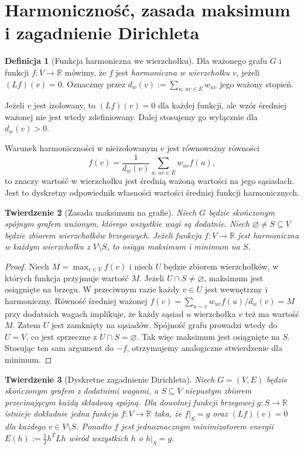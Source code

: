 \documentclass[11pt,a4paper]{report}
\numberwithin{equation}{section}
\theoremstyle{plain}
\newtheorem{twierdzenie}{Twierdzenie}[section]
\theoremstyle{definition}
\newtheorem{definicja}[twierdzenie]{Definicja}
\theoremstyle{remark}
\begin{document}
\section{Harmoniczność, zasada maksimum i zagadnienie Dirichleta}
\label{sec:tg-harmonic}

\begin{definicja}[Funkcja harmoniczna we wierzchołku]
Dla ważonego grafu $G$ i funkcji $f:V\to\mathbb R$
mówimy, że $f$ jest \emph{harmoniczna w wierzchołku $v$},
jeżeli $(Lf)(v)=0$. Oznaczmy przez $d_w(v):=\sum_{u:\,uv\in E}w_{uv}$
jego ważony stopień.
\end{definicja}

Jeżeli $v$ jest izolowany, to $(Lf)(v)=0$ dla każdej funkcji,
ale wzór średniej ważonej nie jest wtedy zdefiniowany.
Dalej stosujemy go wyłącznie dla $d_w(v)>0$.

Warunek harmoniczności w nieizolowanym $v$ jest równoważny równości
\[
f(v)=\frac{1}{d_w(v)}\sum_{u:\,uv\in E}w_{uv}f(u),
\]
to znaczy wartość w wierzchołku jest średnią ważoną wartości
na jego sąsiadach. Jest to dyskretny odpowiednik
własności wartości średniej funkcji harmonicznych.

\begin{twierdzenie}[Zasada maksimum na grafie]
Niech $G$ będzie skończonym spójnym grafem ważonym, którego
wszystkie wagi są dodatnie. Niech $\varnothing\ne S\subseteq V$
będzie zbiorem wierzchołków brzegowych. Jeżeli funkcja
$f:V\to\mathbb R$ jest harmoniczna w każdym wierzchołku
z $V\setminus S$, to osiąga maksimum i minimum na $S$.
\end{twierdzenie}

\begin{proof}
Niech $M=\max_{v\in V}f(v)$ i niech $U$ będzie zbiorem
wierzchołków, w których funkcja przyjmuje wartość $M$.
Jeżeli $U\cap S\ne\varnothing$, maksimum jest osiągnięte
na brzegu. W przeciwnym razie każdy $v\in U$ jest
wewnętrzny i harmoniczny. Równość średniej ważonej
$f(v)=\sum_{u\sim v}w_{uv}f(u)/d_w(v)=M$ przy dodatnich wagach
implikuje, że każdy sąsiad $u$ wierzchołka $v$ też ma
wartość $M$. Zatem $U$ jest zamknięty na sąsiadów.
Spójność grafu prowadzi wtedy do $U=V$, co jest
sprzeczne z $U\cap S=\varnothing$.
Tak więc maksimum jest osiągnięte na $S$.
Stosując ten sam argument do $-f$, otrzymujemy
analogiczne stwierdzenie dla minimum.
\end{proof}

\begin{twierdzenie}[Dyskretne zagadnienie Dirichleta]
\label{thm:tg-dirichlet}
Niech $G=(V,E)$ będzie skończonym grafem z dodatnimi
wagami, a $S\subseteq V$ niepustym zbiorem przecinającym
każdą składową spójną. Dla dowolnej funkcji brzegowej
$g:S\to\mathbb R$ istnieje dokładnie jedna funkcja
$f:V\to\mathbb R$ taka, że $f|_S=g$ oraz
$(Lf)(v)=0$ dla każdego $v\in V\setminus S$.
Ponadto $f$ jest jednoznacznym minimizatorem energii
$E(h):=\tfrac12 h^TLh$ wśród wszystkich $h$ o $h|_S=g$.
\end{twierdzenie}
\end{document}
